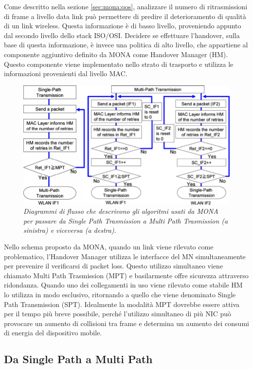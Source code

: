 \documentclass[12pt,a4paper,openright,twoside]{book}
\begin{document}
Come descritto nella sezione \ref{sec:mona:qos}, analizzare il numero
di ritrasmissioni di frame a livello data link può permettere di
predire il deterioramento di qualità di un link wireless. Questa
informazione è di basso livello, proveniendo appunto dal secondo
livello dello stack ISO/OSI. Decidere se effettuare l'handover, sulla
base di questa informazione, è invece una politica di alto livello,
che appartiene al componente aggiuntivo definito da MONA come Handover
Manager (HM). Questo componente viene implementato nello strato di
trasporto e utilizza le informazioni provenienti dal livello MAC.

\begin{figure}
  \centering
  \includegraphics[width=\textwidth]{img/mona-sp-mp}
  \caption{\em Diagrammi di flusso che descrivono gli algoritmi usati da
    MONA per passare da Single Path Trasmission a Multi Path Trasmission
    (a sinistra) e viceversa (a destra).}
  \label{fig:mona:sp-mp}
\end{figure}

Nello schema proposto da MONA, quando un link viene rilevato come
problematico, l'Handover Manager utilizza le interfacce del MN
simultaneamente per prevenire il verificarsi di packet loss. Questo
utilizzo simultaneo viene chiamato Multi Path Trasmission (MPT) e
basilarmente offre sicurezza attraverso ridondanza. Quando uno dei
collegamenti in uso viene rilevato come stabile HM lo utilizza in modo
esclusivo, ritornando a quello che viene denominato Single Path
Transmission (SPT). Idealmente la modalità MPT dovrebbe essere attiva
per il tempo più breve possibile, perché l'utilizzo simultaneo di più
NIC può provocare un aumento di collisioni tra frame e determina un
aumento dei consumi di energia del dispositivo mobile.

\subsection{Da Single Path a Multi Path}
\end{document}
